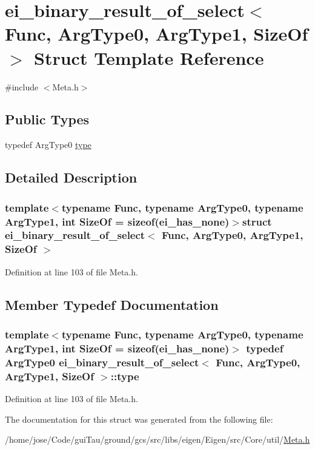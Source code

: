 \hypertarget{structei__binary__result__of__select}{\section{ei\-\_\-binary\-\_\-result\-\_\-of\-\_\-select$<$ Func, Arg\-Type0, Arg\-Type1, Size\-Of $>$ Struct Template Reference}
\label{structei__binary__result__of__select}
}


{\ttfamily \#include $<$Meta.\-h$>$}

\subsection*{Public Types}
\begin{DoxyCompactItemize}
\item 
typedef Arg\-Type0 \hyperlink{structei__binary__result__of__select_a8deec522273bc968aea66cabdb3dbd5f}{type}
\end{DoxyCompactItemize}


\subsection{Detailed Description}
\subsubsection*{template$<$typename Func, typename Arg\-Type0, typename Arg\-Type1, int Size\-Of = sizeof(ei\-\_\-has\-\_\-none)$>$struct ei\-\_\-binary\-\_\-result\-\_\-of\-\_\-select$<$ Func, Arg\-Type0, Arg\-Type1, Size\-Of $>$}



Definition at line 103 of file Meta.\-h.



\subsection{Member Typedef Documentation}
\hypertarget{structei__binary__result__of__select_a8deec522273bc968aea66cabdb3dbd5f}{
\subsubsection[{type}]{\setlength{\rightskip}{0pt plus 5cm}template$<$typename Func, typename Arg\-Type0, typename Arg\-Type1, int Size\-Of = sizeof(ei\-\_\-has\-\_\-none)$>$ typedef Arg\-Type0 {\bf ei\-\_\-binary\-\_\-result\-\_\-of\-\_\-select}$<$ Func, Arg\-Type0, Arg\-Type1, Size\-Of $>$\-::{\bf type}}}\label{structei__binary__result__of__select_a8deec522273bc968aea66cabdb3dbd5f}


Definition at line 103 of file Meta.\-h.



The documentation for this struct was generated from the following file\-:\begin{DoxyCompactItemize}
\item 
/home/jose/\-Code/gui\-Tau/ground/gcs/src/libs/eigen/\-Eigen/src/\-Core/util/\hyperlink{_meta_8h}{Meta.\-h}\end{DoxyCompactItemize}
